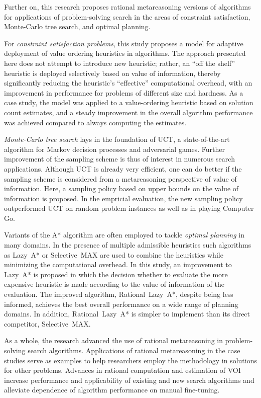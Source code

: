 Further on, this research proposes rational metareasoning versions of
algorithms for applications of problem-solving search in the areas of
constraint satisfaction, Monte-Carlo tree search, and optimal
planning. 

For \emph{constraint satisfaction problems}, this study proposes a model for
adaptive deployment of value ordering heuristics in algorithms. The
approach presented here does not attempt to introduce new
heuristic; rather, an ``off the shelf'' heuristic is deployed
selectively based on value of information, thereby significantly
reducing the heuristic's ``effective'' computational overhead, with an
improvement in performance for problems of different size and
hardness. As a case study, the model was applied to a value-ordering
heuristic based on solution count estimates, and a steady improvement
in the overall algorithm performance was achieved compared to always
computing the estimates.

\emph{Monte-Carlo tree search} lays in the foundation of UCT, a
state-of-the-art algorithm for Markov decision processes and
adversarial games. Further improvement of the sampling scheme is thus
of interest in numerous search applications. Although UCT is already
very efficient, one can do better if the sampling scheme is considered
from a metareasoning perspective of value of information. Here, a
sampling policy based on upper bounds on the value of information is
proposed. In the empricial evaluation, the new sampling policy 
outperformed UCT on random problem instances as well as in playing
Computer Go. 

Variants of the A* algorithm are often employed to tackle 
\emph{optimal planning} in many domains. In the presence of multiple
admissible heuristics such algorithms as Lazy~A* or Selective~MAX
are used to combine the heuristics while minimizing the computational
overhead. In this study, an improvement to Lazy~A* is proposed in
which the decision whether to evaluate the more expensive heuristic is
made according to the value of information of the evaluation. The
improved algorithm, Rational~Lazy~A*, despite being less informed,
achieves the best overall performance on a wide range of planning
domains. In addition,  Rational~Lazy~A* is simpler to implement than
its direct competitor, Selective~MAX.

As a whole, the research advanced the use of rational
metareasoning in problem-solving search algorithms. Applications of
rational metareasoning in the case studies serve as examples
to help researchers employ the methodology in solutions for other
problems. Advances in rational computation and estimation of VOI increase
performance and applicability of existing and new search algorithms
and alleviate dependence of algorithm performance on manual
fine-tuning.

